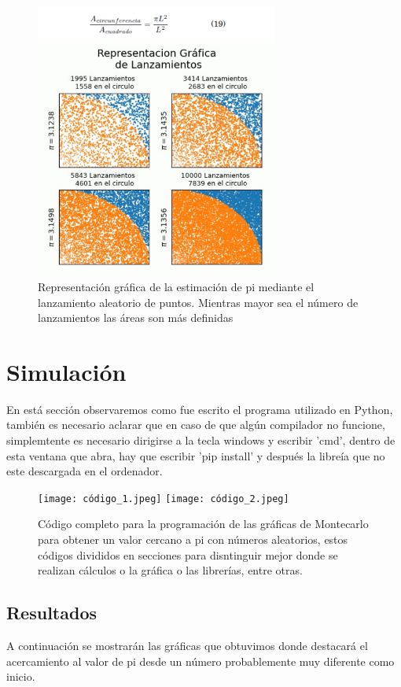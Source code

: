 \documentclass{article}
\begin{document}
\begin{figure}[H] %
    \centering
    \includegraphics[width=80mm]{imagen1.png} %
    \caption{Representación gráfica de la estimación de pi mediante el lanzamiento aleatorio de puntos. Mientras mayor sea el número de lanzamientos las áreas son más definidas\cite{ff2}}
    \label{grafica:trece}
\end{figure}

\section{Simulación}
En está sección observaremos como fue escrito el programa utilizado en Python, también es necesario aclarar que en caso de que algún compilador no funcione, simplemtente es necesario dirigirse a la tecla windows y escribir 'cmd', dentro de esta ventana que abra, hay que escribir 'pip install' y después la libreía que no este descargada en el ordenador.


\begin{figure}[H] %
    \centering
    \texttt{[image: código\_1.jpeg]} %
    \centering
    \texttt{[image: código\_2.jpeg]} %
    \caption{Código completo para la programación de las gráficas de Montecarlo para obtener un valor cercano a pi con números aleatorios, estos códigos divididos en secciones para disntinguir mejor donde se realizan cálculos o la gráfica o las librerías, entre otras.}
    \label{grafica:trece}
\end{figure}

\subsection{Resultados}
A continuación se mostrarán las gráficas que obtuvimos donde destacará el acercamiento al valor de pi desde un número probablemente muy diferente como inicio.
\end{document}
